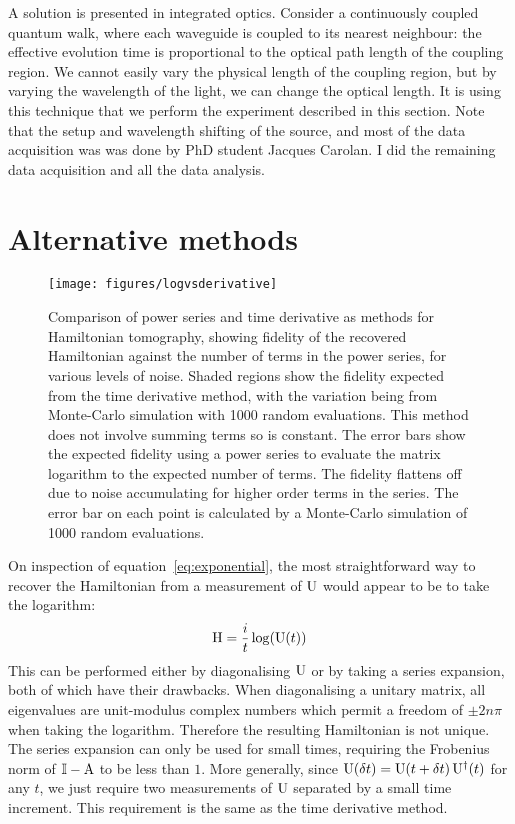A solution is presented in integrated optics. Consider a continuously coupled
quantum walk, where each waveguide is coupled to its nearest neighbour: the
effective evolution time is proportional to the optical path length of the
coupling region. We cannot easily vary the physical length of the coupling
region, but by varying the wavelength of the light, we can change the optical
length. It is using this technique that we perform the experiment described in
this section. Note that the setup and wavelength shifting of the source, and
most of the data acquisition was was done by PhD student Jacques Carolan. I did
the remaining data acquisition and all the data analysis.

\section{Alternative methods}
\label{sec:Alternatives}
\begin{figure}[t]
  \texttt{[image: figures/logvsderivative]}
  \caption[Comparison of power series and time derivative methods for
  Hamiltonian recovery]
  {Comparison of power series and time derivative as methods for Hamiltonian
  tomography, showing fidelity of the recovered Hamiltonian against the number
  of terms in the power series, for various levels of noise. Shaded regions show
  the fidelity expected from the time derivative method, with the variation
  being from Monte-Carlo simulation with 1000 random evaluations. This method
  does not involve summing terms so is constant. The error bars show the
  expected fidelity using a power series to evaluate the matrix logarithm to the
  expected number of terms. The fidelity flattens off due to noise accumulating
  for higher order terms in the series. The error bar on each point is
  calculated by a Monte-Carlo simulation of 1000 random evaluations.}
  \label{fig:logvsderivative}
\end{figure}
On inspection of equation~\ref{eq:exponential}, the most straightforward way to
recover the Hamiltonian from a measurement of \(\mathrm{U}\) would appear to be to
take the logarithm:
\begin{equation}
  \mathrm{H} = \frac{i}{t} \log \!\left(\mathrm{U} \!\left(t\right)\right)
\end{equation}
This can be performed either by diagonalising \(\mathrm{U}\) or by taking a series
expansion, both of which have their drawbacks. When diagonalising a unitary
matrix, all eigenvalues are unit-modulus complex numbers which permit a freedom
of \(\pm 2 n \pi\) when taking the logarithm. Therefore the resulting
Hamiltonian is not unique. The series expansion can only be used for small
times, requiring the Frobenius norm of \(\mathbb{I}-\mathrm{A}\) to be less than
\(1\). More generally, since \(\mathrm{U} \!\left(\delta t\right) = \mathrm{U} \!\left(t+\delta t\right)
\mathrm{U}^{\dagger} \!\left(t\right)\) for any \(t\), we just require two measurements of
\(\mathrm{U}\) separated by a small time increment. This requirement is the same as
the time derivative method.

